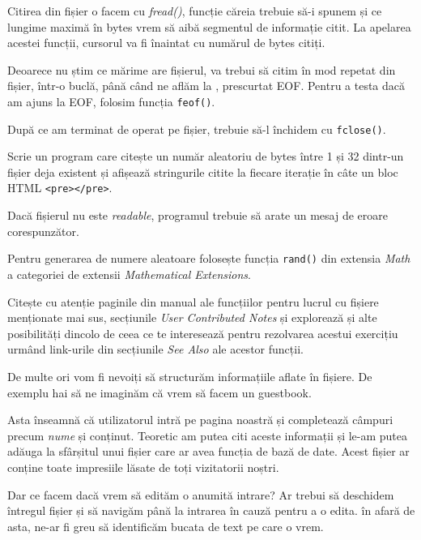 Citirea din fișier o facem cu \textsl{fread()}, funcție căreia trebuie
să-i spunem și ce lungime maximă în bytes vrem să aibă segmentul
de informație citit.
La apelarea acestei funcții, cursorul va fi înaintat cu numărul
de bytes citiți.

Deoarece nu știm ce mărime are fișierul, va trebui să citim
în mod repetat din fișier, într-o buclă, până când ne aflăm
la , prescurtat EOF.
Pentru a testa dacă am ajuns la EOF, folosim funcția \texttt{feof()}.

După ce am terminat de operat pe fișier, trebuie să-l închidem cu
\texttt{fclose()}.

\begin{Exercise}[title={Citește din fișier}]
Scrie un program care 
citește un număr aleatoriu de bytes între 1 și 32 dintr-un fișier deja existent
și afișează stringurile citite la fiecare iterație în câte
un bloc HTML \texttt{<pre></pre>}.

Dacă fișierul nu este \textit{readable}, programul trebuie
să arate un mesaj de eroare corespunzător.

Pentru generarea de numere aleatoare folosește funcția
\texttt{rand()} din extensia \textit{Math} a categoriei
de extensii \textit{Mathematical Extensions}.

Citește cu atenție paginile din manual ale funcțiilor pentru
lucrul cu fișiere menționate mai sus, secțiunile \textit{User
Contributed Notes} și explorează și alte posibilități
dincolo de ceea ce te interesează pentru rezolvarea acestui
exercițiu urmând link-urile din secțiunile \textit{See Also}
ale acestor funcții.
\end{Exercise}

De multe ori vom fi nevoiți să structurăm informațiile aflate \^in
fișiere. De exemplu hai să ne imaginăm că vrem să facem un guestbook.

Asta \^inseamnă că utilizatorul intră pe pagina noastră și completează
c\^ampuri precum \textit{nume} și conținut. Teoretic am putea citi
aceste informații și le-am putea adăuga la sf\^arșitul unui fișier
care ar avea funcția de {\glqq}bază de date{\grqq}. Acest
fișier ar conține toate impresiile lăsate de toți vizitatorii noștri.

Dar ce facem dacă vrem să edităm o anumită intrare? Ar trebui să
deschidem \^intregul fișier și să navigăm p\^ană la intrarea \^in cauză
pentru a o edita. \^in afară de asta, ne-ar fi greu să identificăm
bucata de text pe care o vrem.

